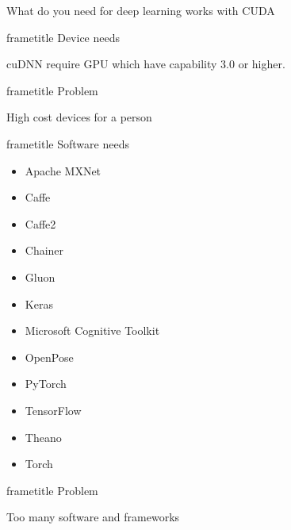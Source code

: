 \begin{frame}[plain,t]
  {What do you need for deep learning works with CUDA}

  \begin{multicols}{2}
    \begin{beamercolorbox}[rounded=true, center, shadow=true,wd=\linewidth]{frametitle}
      Device needs
    \end{beamercolorbox}
    cuDNN require GPU which have capability 3.0 or higher.

    \begin{beamercolorbox}[rounded=true, center, shadow=true,wd=\linewidth]{frametitle}
      Problem
    \end{beamercolorbox}
    High cost devices for a person

    \newpage
    \begin{beamercolorbox}[rounded=true, center, shadow=true,wd=\linewidth]{frametitle}
      Software needs
    \end{beamercolorbox}
    \begin{itemize}
      \item Apache MXNet
      \item Caffe
      \item Caffe2
      \item Chainer
      \item Gluon
      \item Keras
      \item Microsoft Cognitive Toolkit
      \item OpenPose
      \item PyTorch
      \item TensorFlow
      \item Theano
      \item Torch
    \end{itemize}

    \begin{beamercolorbox}[rounded=true, center, shadow=true,wd=\linewidth]{frametitle}
      Problem
    \end{beamercolorbox}
    Too many software and frameworks
  \end{multicols}
\end{frame}


